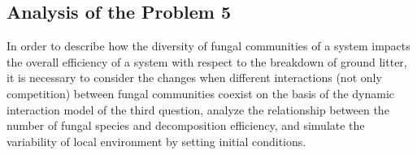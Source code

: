 \subsection{Analysis of the Problem 5}
In order to describe how the diversity of fungal communities of a system impacts the overall efficiency of a system with respect to the breakdown of ground litter, it is necessary to consider the changes when different interactions (not only competition) between fungal communities coexist on the basis of the dynamic interaction model of the third question, analyze the relationship between the number of fungal species and decomposition efficiency, and simulate the variability of local environment by setting initial conditions.